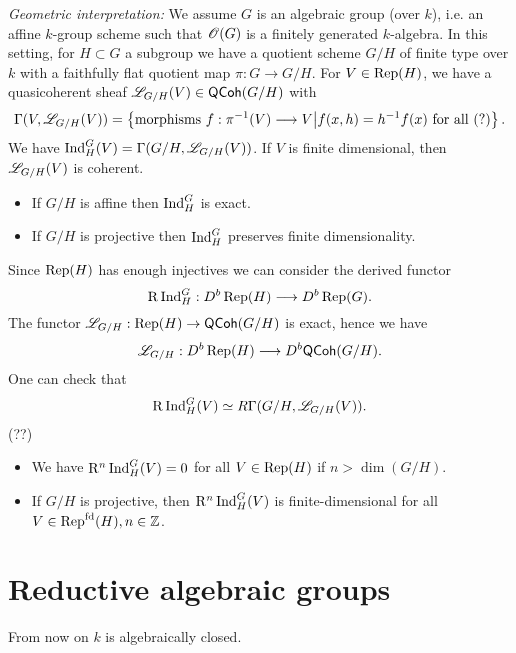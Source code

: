 	\emph{Geometric interpretation:} We assume $G$ is an algebraic group (over $k$), i.e. an
	affine $k$-group scheme such that $\mathscr{O}(G)$ is a finitely generated $k$-algebra. In this
	setting, for $H\subset G$ a subgroup we have a quotient scheme $G /H$ of finite type
	over $k$ with a faithfully flat quotient map $\pi:G\to G /H$. For $V\in \operatorname{Rep}(H)$, we
	have a quasicoherent sheaf $\mathscr{L}_{G /H}(V)\in \mathsf{QCoh}(G /H)$ with
	\[
		\Gamma(V,\CL_{G /H}(V)) = \left\{ \text{morphisms } f:\pi^{-1}(V)\to V \middle|
		f(x,h)=h^{-1}f(x)\text{ for all }(?)  \right\}
	.\]
	We have $\operatorname{Ind}_{H}^{G}(V) = \Gamma(G /H,\mathscr{L}_{G /H}(V))$. If $V$ is finite dimensional,
	then $\mathscr{L}_{G /H}(V)$ is coherent.

	\begin{consequences} \leavevmode
		\begin{itemize}
			\item If $G /H$ is affine then $\operatorname{Ind}_{H}^{G}$ is exact.
			\item If $G /H$ is projective then $\operatorname{Ind}_{H}^{G}$ preserves finite dimensionality.
		\end{itemize}
	\end{consequences}

	Since $\operatorname{Rep}(H)$ has enough injectives we can consider the derived functor
	\[
		\RD\Ind_H^{G}:D^{b}\Rep(H)\to D^{b}\Rep(G).
	\]
	The functor $\CL_{G /H}:\Rep(H)\to \cat{QCoh}(G /H)$ is exact, hence we have
	\[
		\CL_{G /H}:D^{b}\Rep(H)\to D^{b}\cat{QCoh}(G /H).
	\]
	One can check that
	\[
		\mathrm{R}\operatorname{Ind}_H^{G}(V) \simeq R\Gamma(G /H, \mathscr{L}_{G /H}(V)).
	\]
	(??)

	\begin{consequences} \leavevmode
		\begin{itemize}
			\item We have $\mathrm{R}^{n}\operatorname{Ind}_H^{G}(V)=0$ for all $V\in \operatorname{Rep}(H)$ if $n>\dim(G /H)$.
			\item If $G /H$ is projective, then $\mathrm{R}^{n}\operatorname{Ind}_H^{G}(V)$ is finite-dimensional for
				all $V\in \operatorname{Rep}^{\text{fd}}(H), n\in \mathbb Z$.
		\end{itemize}
	\end{consequences}

	\newpage

	\section{Reductive algebraic groups}
	From now on $k$ is algebraically closed.

